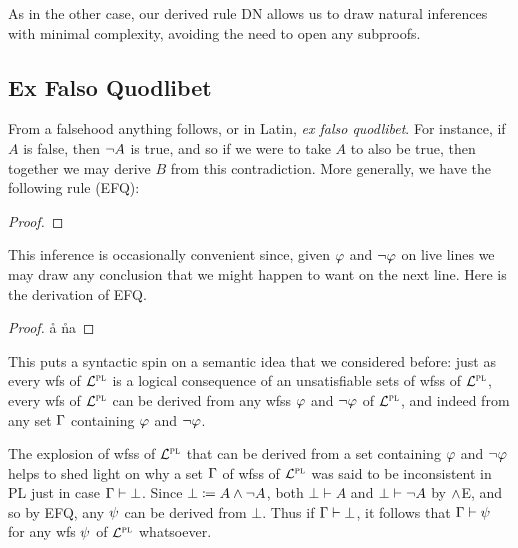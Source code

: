 As in the other case, our derived rule DN allows us to draw natural inferences with minimal complexity, avoiding the need to open any subproofs.




\subsection{Ex Falso Quodlibet}
  \label{EFQ}

From a falsehood anything follows, or in Latin, \textit{ex falso quodlibet}.
For instance, if $A$ is false, then $\neg A$ is true, and so if we were to take $A$ to also be true, then together we may derive $B$ from this contradiction. 
More generally, we have the following rule (EFQ):

\begin{proof}
\end{proof}

This inference is occasionally convenient since, given $\varphi$ and $\neg\varphi$ on live lines we may draw any conclusion that we might happen to want on the next line. 
Here is the derivation of EFQ.

\begin{proof}
  \open 
     
     \r{a}
     \r{na}
  \close
   
\end{proof}

This puts a syntactic spin on a semantic idea that we considered before: just as every wfs of $\mathcal{L}^{\textsc{pl}}$ is a logical consequence of an unsatisfiable sets of wfss of $\mathcal{L}^{\textsc{pl}}$, every wfs of $\mathcal{L}^{\textsc{pl}}$ can be derived from any wfss $\varphi$ and $\neg\varphi$ of $\mathcal{L}^{\textsc{pl}}$, and indeed from any set $\Gamma$ containing $\varphi$ and $\neg\varphi$. 

The explosion of wfss of $\mathcal{L}^{\textsc{pl}}$ that can be derived from a set containing $\varphi$ and $\neg \varphi$ helps to shed light on why a set $\Gamma$ of wfss of $\mathcal{L}^{\textsc{pl}}$ was said to be inconsistent in PL just in case $\Gamma \vdash \bot$.
Since $\bot \coloneq A \wedge \neg A$, both $\bot \vdash A$ and $\bot \vdash \neg A$ by $\wedge$E, and so by EFQ, any $\psi$ can be derived from $\bot$. 
Thus if $\Gamma \vdash \bot$, it follows that $\Gamma \vdash \psi$ for any wfs $\psi$ of $\mathcal{L}^{\textsc{pl}}$ whatsoever. 





